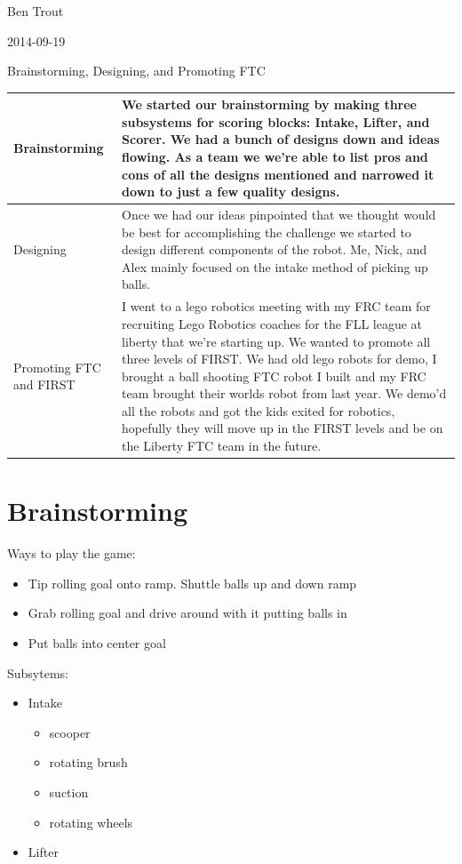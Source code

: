 Ben Trout

2014-09-19

Brainstorming, Designing, and Promoting FTC

\begin{tabular}{|p{5cm}|p{5cm}|}
 \hline
 Brainstorming&
 We started our brainstorming by making three subsystems for scoring blocks:
 Intake, Lifter, and Scorer. We had a bunch of designs down and ideas flowing.
 As a team we we’re able to list pros and cons of all the designs mentioned and narrowed
 it down to just a few quality designs.
 \\
 \hline
 Designing&
 Once we had our ideas pinpointed that we thought would be best for accomplishing
 the challenge we started to design different components of the robot.
 Me, Nick, and Alex mainly focused on the intake method of picking up balls.
 \\
 \hline
 Promoting FTC and FIRST&
 I went to a lego robotics meeting with my FRC team for recruiting Lego Robotics coaches
 for the FLL league at liberty that we’re starting up. We wanted to promote all three
 levels of FIRST. We had old lego robots for demo, I brought a ball shooting FTC robot
 I built and my FRC team brought their worlds robot from last year.
 We demo’d all the robots and got the kids exited for robotics, hopefully they will
 move up in the FIRST levels and be on the Liberty FTC team in the future.
 \\
 \hline
\end{tabular}

\section*{Brainstorming}
Ways to play the game:
\begin{itemize}
 \item Tip rolling goal onto ramp. Shuttle balls up and down ramp
 \item Grab rolling goal and drive around with it putting balls in
 \item Put balls into center goal %
\end{itemize}
Subsytems:
\begin{itemize}
 \item Intake
 \begin{itemize}
  \item scooper
  \item rotating brush
  \item suction
  \item rotating wheels
 \end{itemize}
 \item Lifter
\end{itemize}

